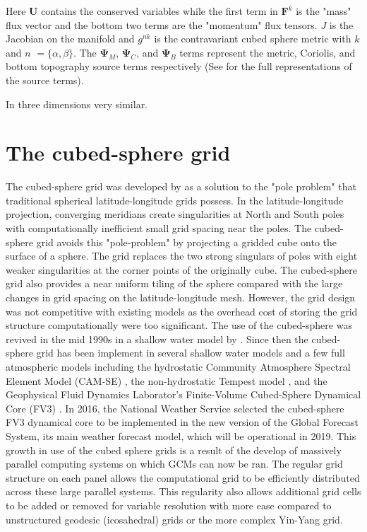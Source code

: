 Here $\mathbf{U}$ contains the conserved variables while the first term in $\mathbf{F}^{k}$ is the "mass" flux vector and the bottom two terms are the "momentum" flux tensors.  $J$ is the Jacobian on the manifold and $g^{nk}$ is the contravariant cubed sphere metric with $k$ and $n$ $=\{\alpha,\beta\}$.  The $\mathbf{\Psi}_{M}$, $\mathbf{\Psi}_{C}$, and $\mathbf{\Psi}_{B}$ terms represent the metric, Coriolis, and bottom topography source terms respectively (See \cite{McCorquodale:2014rw} for the full representations of the source terms). 

In three dimensions very similar.

\section{The cubed-sphere grid}
The cubed-sphere grid was developed by \cite{Sardony} as a solution to the "pole problem" that traditional spherical latitude-longitude grids 
possess. In the latitude-longitude  projection, converging meridians create singularities at North and South poles with computationally inefficient 
small grid spacing near the poles. The cubed-sphere grid avoids this "pole-problem" by projecting a gridded cube onto the surface of a sphere. The grid replaces the two strong singulars of poles with eight weaker singularities at
the corner points of the originally cube.  The cubed-sphere grid also provides a near uniform tiling of the sphere compared with the
large changes in grid spacing on the latitude-longitude mesh. However, the grid design
was not competitive with existing models as the overhead cost of storing the grid structure computationally
were too significant. The use of the cubed-sphere was revived in the mid 1990s in a shallow water 
model by \cite{Ronchietal}. Since then the cubed-sphere grid has been implement in several shallow water models and 
a few full atmospheric
models including the hydrostatic Community Atmosphere Spectral Element Model (CAM-SE) \citep{dennis2012cam}, the
non-hydrostatic Tempest model \citep{ullrich2014global,guerra2016high}, and the
Geophysical Fluid Dynamics Laborator's Finite-Volume Cubed-Sphere Dynamical Core (FV3) \citep{lin2004vertically,Harris:2013n}.
In 2016, the National Weather Service selected the cubed-sphere FV3 dynamical core to be implemented in the new version
of the Global Forecast System, its main weather forecast model, which will be operational in 2019.
This growth in use of the cubed sphere grids is a result of the develop of massively
parallel computing systems on which GCMs can now be ran. 
The regular grid structure on each panel allows the computational grid to be efficiently distributed
across these large parallel systems. This regularity also allows additional grid cells to be added or 
removed for variable resolution with more ease compared to unstructured geodesic (icosahedral) grids or the 
more complex Yin-Yang grid.

